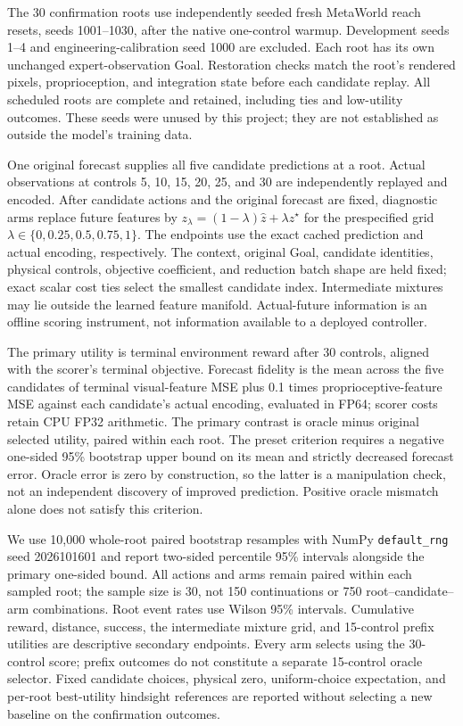 \documentclass[11pt]{article}
\begin{document}
The 30 confirmation roots use independently seeded fresh MetaWorld reach
resets, seeds 1001--1030, after the native one-control warmup. Development seeds
1--4 and engineering-calibration seed 1000 are excluded. Each root has its own
unchanged expert-observation Goal. Restoration checks match the root's rendered
pixels, proprioception, and integration state before each candidate replay.
All scheduled roots are complete and retained, including ties and low-utility
outcomes. These seeds were unused by this project; they are not established
as outside the model's training data.

One original forecast supplies all five candidate predictions at a root.
Actual observations at controls 5, 10, 15, 20, 25, and 30 are independently
replayed and encoded. After candidate actions and the original forecast are
fixed, diagnostic arms replace future features by
$z_{\lambda}=(1-\lambda)\hat z+\lambda z^\star$ for the prespecified grid
$\lambda\in\{0,0.25,0.5,0.75,1\}$. The endpoints use the exact cached
prediction and actual encoding, respectively. The context, original Goal,
candidate identities, physical controls, objective coefficient, and reduction
batch shape are held fixed; exact scalar cost ties select the smallest
candidate index. Intermediate mixtures may lie outside the learned feature
manifold. Actual-future information is an offline scoring instrument, not
information available to a deployed controller.

The primary utility is terminal environment reward after 30 controls, aligned
with the scorer's terminal objective. Forecast fidelity is the mean across
the five candidates of terminal visual-feature MSE plus 0.1 times
proprioceptive-feature MSE against each candidate's actual encoding, evaluated
in FP64; scorer costs retain CPU FP32 arithmetic. The primary contrast is
oracle minus original selected utility, paired within each root. The preset
criterion requires a negative one-sided 95\% bootstrap upper bound on its
mean and strictly decreased forecast error. Oracle error is zero by
construction, so the latter is a manipulation check, not an independent
discovery of improved prediction. Positive oracle mismatch alone does not
satisfy this criterion.

We use 10,000 whole-root paired bootstrap resamples with NumPy
\texttt{default\_rng} seed 2026101601 and report two-sided percentile 95\%
intervals alongside the primary one-sided bound. All actions and arms remain
paired within each sampled root; the sample size is 30, not 150 continuations
or 750 root--candidate--arm combinations. Root event rates use Wilson 95\%
intervals. Cumulative reward, distance, success, the intermediate mixture
grid, and 15-control prefix utilities are descriptive secondary endpoints.
Every arm selects using the 30-control score; prefix outcomes do not constitute
a separate 15-control oracle selector. Fixed candidate choices, physical zero,
uniform-choice expectation, and per-root best-utility hindsight references
are reported without selecting a new baseline on the confirmation outcomes.
\end{document}
